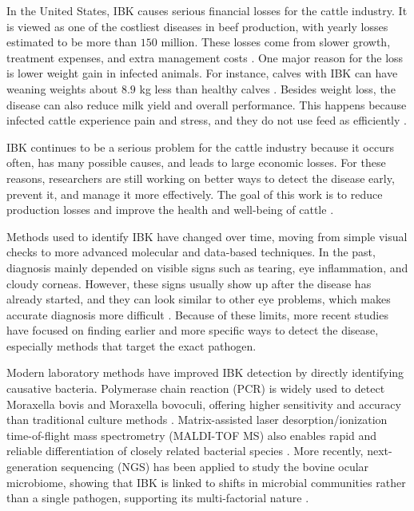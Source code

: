 \documentclass[preprint,12pt,authoryear]{elsarticle}
\begin{document}
In the United States, IBK causes serious financial losses for the cattle industry. It is viewed as one of the costliest diseases in beef production, with yearly losses estimated to be more than $150$ million. These losses come from slower growth, treatment expenses, and extra management costs \citep{bartenslager2021, angelos2015}. One major reason for the loss is lower weight gain in infected animals. For instance, calves with IBK can have weaning weights about $8.9$ kg less than healthy calves \citep{kilama2025}. Besides weight loss, the disease can also reduce milk yield and overall performance. This happens because infected cattle experience pain and stress, and they do not use feed as efficiently \citep{kilama2025}.

IBK continues to be a serious problem for the cattle industry because it occurs often, has many possible causes, and leads to large economic losses. For these reasons, researchers are still working on better ways to detect the disease early, prevent it, and manage it more effectively. The goal of this work is to reduce production losses and improve the health and well-being of cattle \citep{gupta2023}.

Methods used to identify IBK have changed over time, moving from simple visual checks to more advanced molecular and data-based techniques. In the past, diagnosis mainly depended on visible signs such as tearing, eye inflammation, and cloudy corneas. However, these signs usually show up after the disease has already started, and they can look similar to other eye problems, which makes accurate diagnosis more difficult \citep{snowder2005, angelos2015}. Because of these limits, more recent studies have focused on finding earlier and more specific ways to detect the disease, especially methods that target the exact pathogen.

Modern laboratory methods have improved IBK detection by directly identifying causative bacteria. Polymerase chain reaction (PCR) is widely used to detect Moraxella bovis and Moraxella bovoculi, offering higher sensitivity and accuracy than traditional culture methods \citep{angelos2007, angelos2015}. Matrix-assisted laser desorption/ionization time-of-flight mass spectrometry (MALDI-TOF MS) also enables rapid and reliable differentiation of closely related bacterial species \citep{seng2009}. More recently, next-generation sequencing (NGS) has been applied to study the bovine ocular microbiome, showing that IBK is linked to shifts in microbial communities rather than a single pathogen, supporting its multi-factorial nature \citep{holman2017}.
\end{document}

